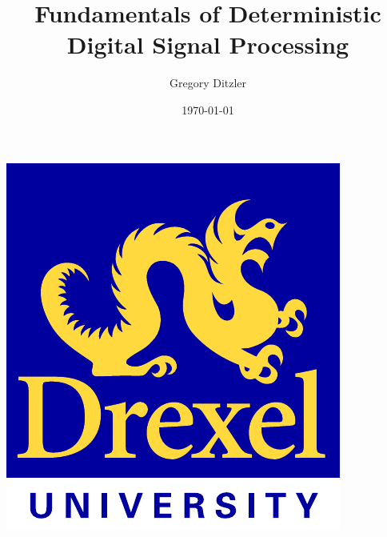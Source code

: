 \documentclass[mathserif,9pt,handout]{beamer}
\begin{document}
\title[\url{gregory.ditzler@gmail.com}]{\bf Fundamentals of Deterministic Digital Signal Processing}
\author[Deterministic Digital Signal Processing]{Gregory Ditzler}
\date[\today]{\scriptsize \today}




\begin{frame}
  \titlepage\vfill
  \vspace{-2em}
  \begin{center}
    \includegraphics[scale=.3,keepaspectratio]{drexel-logo.pdf} 
  \end{center}
\end{frame}
\end{document}
